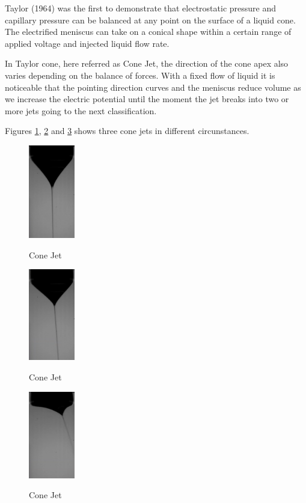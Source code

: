 Taylor (1964)\cite{taylor} was the first to demonstrate that electrostatic pressure and capillary pressure can be balanced at any point on the surface of a liquid cone.
The electrified meniscus can take on a conical shape within a certain range of applied voltage and injected liquid flow rate. 

In Taylor cone, here referred as Cone Jet, the direction of the cone apex also varies depending on the balance of forces. 
With a fixed flow of liquid it is noticeable that the pointing direction curves and the meniscus reduce volume as we increase the electric potential until the moment the jet breaks into two or more jets going to the next classification. 

Figures \ref{fig:conjt1}, \ref{fig:conjt2} and \ref{fig:conjt3} shows three cone jets in different circunstances.

\begin{multicols}{3}

  \begin{figure}[H]
      \center
      \includegraphics[width=2cm]{Figuras/april/conjet1.png}
      \label{fig:conjt1}
      \caption{Cone Jet}
  \end{figure}


  \begin{figure}[H]
      \center
      \includegraphics[width=2cm]{Figuras/april/conjet2.png}
      \label{fig:conjt2}
      \caption{Cone Jet}
  \end{figure}


  \begin{figure}[H]
      \center
      \includegraphics[width=2cm]{Figuras/april/conjet3.png}
      \label{fig:conjt3}
      \caption{Cone Jet}
  \end{figure}

\end{multicols}

